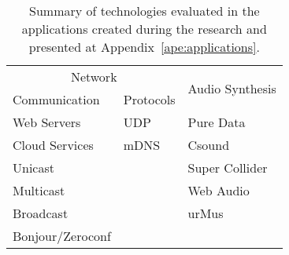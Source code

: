 \begin{table}[!ht]
	\centering
	\begin{tabular}{l|l|l}
		\multicolumn{2}{c|}{Network} & \multirow{2}{*}{Audio Synthesis} \\
		Communication    & Protocols &                                  \\ \hline
		Web Servers      & UDP       & Pure Data                        \\ \hline
		Cloud Services   & mDNS      & Csound                           \\ \cline{1-1} \cline{3-3} 
		Unicast          &           & Super Collider                   \\ \cline{1-1} \cline{3-3} 
		Multicast        &           & Web Audio                        \\ \cline{1-1} \cline{3-3} 
		Broadcast        &           & urMus                            \\ \cline{1-1}
		Bonjour/Zeroconf &           &                                  \\ \hline
	\end{tabular}
	\caption{Summary of technologies evaluated in the applications created during the research and presented at Appendix~\ref{ape:applications}.}
	\label{tab:summarytechapps}
\end{table}
